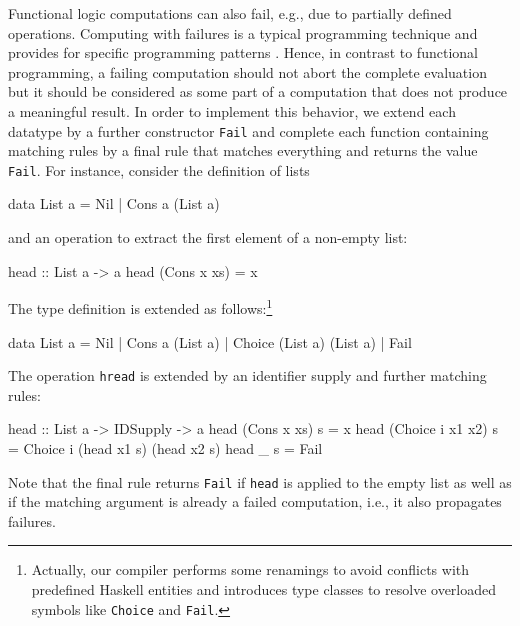 \documentclass{llncs}
\newcommand{\code}[1]{\mbox{\small\texttt{#1}}}
\begin{document}
Functional logic computations can also fail, e.g.,
due to partially defined operations.
Computing with failures is a typical programming technique
and provides for specific programming patterns \cite{AntoyHanus02FLOPS}.
Hence, in contrast to functional programming,
a failing computation should not abort the complete evaluation
but it should be considered as some part of a computation that
does not produce a meaningful result.
In order to implement this behavior, we extend
each datatype by a further constructor \code{Fail}
and complete each function containing matching rules
by a final rule that matches everything and returns the value \code{Fail}.
For instance, consider the definition of lists
\begin{curry}
  data List a = Nil | Cons a (List a)
\end{curry}
and an operation to extract the first element of a non-empty list:
\begin{curry}
  head :: List a -> a
  head (Cons x xs) = x
\end{curry}
The type definition is extended as follows:\footnote{Actually,
our compiler performs some renamings to avoid conflicts with
predefined Haskell entities and introduces type classes
to resolve overloaded symbols like \code{Choice} and \code{Fail}.}
\begin{haskell}
  data List a = Nil | Cons a (List a) | Choice (List a) (List a) | Fail
\end{haskell}
The operation \code{hread} is extended by an identifier supply
and further matching rules:
\begin{haskell}
  head :: List a -> IDSupply -> a
  head (Cons x xs)      s = x
  head (Choice i x1 x2) s = Choice i (head x1 s) (head x2 s)
  head _                s = Fail
\end{haskell}
Note that the final rule returns \code{Fail} if \code{head} is
applied to the empty list as well as if the matching argument
is already a failed computation, i.e., it also propagates failures.
\end{document}

